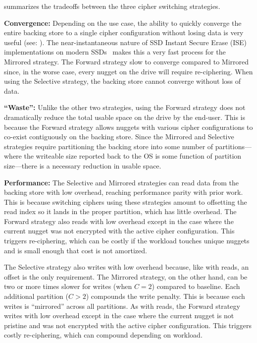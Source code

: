  summarizes the tradeoffs between the three cipher
switching strategies.

\textbf{Convergence:} Depending on the use case, the ability to quickly converge
the entire backing store to a single cipher configuration without losing data is
very useful (see: ). The near-instantaneous nature of SSD
Instant Secure Erase (ISE) implementations on modern SSDs~\cite{ISE1,ISE2,ISE3}
makes this a very fast process for the Mirrored strategy. The Forward strategy
slow to converge compared to Mirrored since, in the worse case, every nugget on
the drive will require re-ciphering. When using the Selective strategy, the
backing store cannot converge without loss of data.

\textbf{``Waste'':} Unlike the other two strategies, using the Forward strategy
does not dramatically reduce the total usable space on the drive by the
end-user. This is because the Forward strategy allows nuggets with various
cipher configurations to co-exist contiguously on the backing store. Since the
Mirrored and Selective strategies require partitioning the backing store into
some number of partitions---where the writeable size reported back to the OS is
some function of partition size---there is a necessary reduction in usable
space.

\textbf{Performance:} The Selective and Mirrored strategies can read data from
the backing store with low overhead, reaching performance parity with prior
work. This is because switching ciphers using these strategies amount to
offsetting the read index so it lands in the proper partition, which has little
overhead. The Forward strategy also reads with low overhead except in the case
where the current nugget was not encrypted with the active cipher configuration.
This triggers re-ciphering, which can be costly if the workload touches unique
nuggets and is small enough that cost is not amortized.

The Selective strategy also writes with low overhead because, like with reads,
an offset is the only requirement. The Mirrored strategy, on the other hand, can
be two or more times slower for writes (when $C = 2$) compared to baseline. Each
additional partition ($C > 2$) compounds the write penalty. This is because each
writes is ``mirrored'' across all partitions. As with reads, the Forward
strategy writes with low overhead except in the case where the current nugget is
not pristine and was not encrypted with the active cipher configuration. This
triggers costly re-ciphering, which can compound depending on workload.

